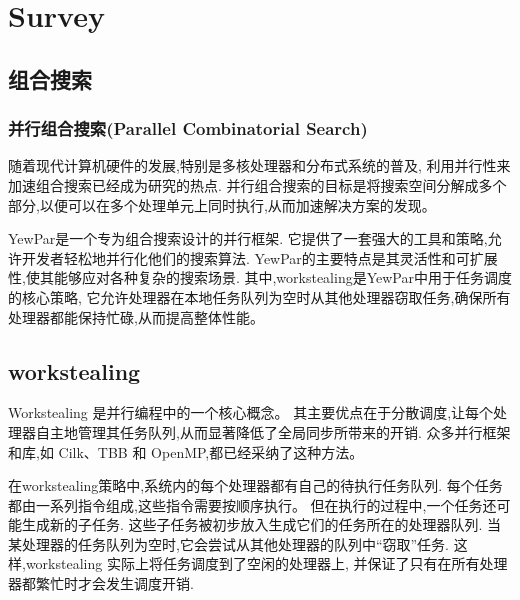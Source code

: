 \documentclass{mproj}
\begin{document}
\chapter{Survey}\label{survey}

\section{组合搜索}

\subsection{并行组合搜索(Parallel Combinatorial Search)}
随着现代计算机硬件的发展,特别是多核处理器和分布式系统的普及,
利用并行性来加速组合搜索已经成为研究的热点.
并行组合搜索的目标是将搜索空间分解成多个部分,以便可以在多个处理单元上同时执行,从而加速解决方案的发现。

YewPar是一个专为组合搜索设计的并行框架.
它提供了一套强大的工具和策略,允许开发者轻松地并行化他们的搜索算法.
YewPar的主要特点是其灵活性和可扩展性,使其能够应对各种复杂的搜索场景.
其中,workstealing是YewPar中用于任务调度的核心策略,
它允许处理器在本地任务队列为空时从其他处理器窃取任务,确保所有处理器都能保持忙碌,从而提高整体性能。

\section{workstealing}
Workstealing 是并行编程中的一个核心概念。
其主要优点在于分散调度,让每个处理器自主地管理其任务队列,从而显著降低了全局同步所带来的开销.
众多并行框架和库,如 Cilk、TBB 和 OpenMP,都已经采纳了这种方法。

在workstealing策略中,系统内的每个处理器都有自己的待执行任务队列.
每个任务都由一系列指令组成,这些指令需要按顺序执行。
但在执行的过程中,一个任务还可能生成新的子任务.
这些子任务被初步放入生成它们的任务所在的处理器队列.
当某处理器的任务队列为空时,它会尝试从其他处理器的队列中“窃取”任务.
这样,workstealing 实际上将任务调度到了空闲的处理器上,
并保证了只有在所有处理器都繁忙时才会发生调度开销.\cite{10.1145/1248377.1248396}
\end{document}
